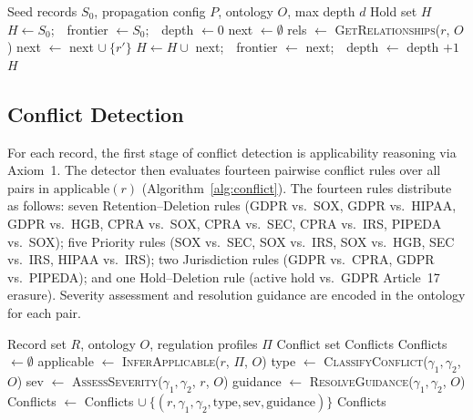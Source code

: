 \documentclass{ieeeaccess}
\begin{document}
\begin{algorithm}[t]
\caption{Semantic Hold Propagation}
\label{alg:propagation}
\begin{algorithmic}[1]
\Require Seed records $S_0$, propagation config $P$, ontology $O$, max depth $d$
\Ensure Hold set $H$
\State $H \gets S_0$;\ \ frontier $\gets S_0$;\ \ depth $\gets 0$
    \State next $\gets \emptyset$
        \State rels $\gets$ \textsc{GetRelationships}($r$, $O$)
                \State next $\gets$ next $\cup\ \{r'\}$
            \EndIf
        \EndFor
    \EndFor
    \State $H \gets H \cup$ next;\ \ frontier $\gets$ next;\ \ depth $\gets$ depth $+ 1$
\EndWhile
\State \Return $H$
\end{algorithmic}
\end{algorithm}

\subsection{Conflict Detection}

For each record, the first stage of conflict detection is applicability reasoning via Axiom~1. The detector then evaluates fourteen pairwise conflict rules over all pairs in $\mathrm{applicable}(r)$ (Algorithm~\ref{alg:conflict}). The fourteen rules distribute as follows: seven Retention--Deletion rules (GDPR vs.\ SOX, GDPR vs.\ HIPAA, GDPR vs.\ HGB, CPRA vs.\ SOX, CPRA vs.\ SEC, CPRA vs.\ IRS, PIPEDA vs.\ SOX); five Priority rules (SOX vs.\ SEC, SOX vs.\ IRS, SOX vs.\ HGB, SEC vs.\ IRS, HIPAA vs.\ IRS); two Jurisdiction rules (GDPR vs.\ CPRA, GDPR vs.\ PIPEDA); and one Hold--Deletion rule (active hold vs.\ GDPR Article~17 erasure). Severity assessment and resolution guidance are encoded in the ontology for each pair.

\begin{algorithm}[t]
\caption{Conflict Detection}
\label{alg:conflict}
\begin{algorithmic}[1]
\Require Record set $R$, ontology $O$, regulation profiles $\Pi$
\Ensure Conflict set Conflicts
\State Conflicts $\gets \emptyset$
    \State applicable $\gets$ \textsc{InferApplicable}($r$, $\Pi$, $O$)
            \State type $\gets$ \textsc{ClassifyConflict}($\gamma_1, \gamma_2$, $O$)
            \State sev $\gets$ \textsc{AssessSeverity}($\gamma_1, \gamma_2$, $r$, $O$)
            \State guidance $\gets$ \textsc{ResolveGuidance}($\gamma_1, \gamma_2$, $O$)
            \State Conflicts $\gets$ Conflicts $\cup\ \{(r, \gamma_1, \gamma_2, \mathrm{type}, \mathrm{sev}, \mathrm{guidance})\}$
        \EndIf
    \EndFor
\EndFor
\State \Return Conflicts
\end{algorithmic}
\end{algorithm}
\end{document}
